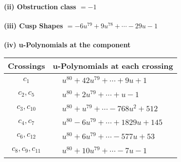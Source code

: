 \documentclass[1p]{elsarticle_modified}
\theoremstyle{definition}
\begin{document}
\flushleft \textbf{(ii) Obstruction class $= -1$}\\~\\
\flushleft \textbf{(iii) Cusp Shapes $= -6 u^{79}+9 u^{78}+\cdots-29 u-1$}\\~\\
\newpage\renewcommand{\arraystretch}{1}
\flushleft \textbf{(iv) u-Polynomials at the component}\newline \\
\begin{tabular}{m{50pt}|m{274pt}}
Crossings & \hspace{64pt}u-Polynomials at each crossing \\
\hline $$\begin{aligned}c_{1}\end{aligned}$$&$\begin{aligned}
&u^{80}+42 u^{79}+\cdots+9 u+1
\end{aligned}$\\
\hline $$\begin{aligned}c_{2},c_{5}\end{aligned}$$&$\begin{aligned}
&u^{80}+2 u^{79}+\cdots+u-1
\end{aligned}$\\
\hline $$\begin{aligned}c_{3},c_{10}\end{aligned}$$&$\begin{aligned}
&u^{80}+u^{79}+\cdots-768 u^2+512
\end{aligned}$\\
\hline $$\begin{aligned}c_{4},c_{7}\end{aligned}$$&$\begin{aligned}
&u^{80}-6 u^{79}+\cdots+1829 u+145
\end{aligned}$\\
\hline $$\begin{aligned}c_{6},c_{12}\end{aligned}$$&$\begin{aligned}
&u^{80}+6 u^{79}+\cdots-577 u+53
\end{aligned}$\\
\hline $$\begin{aligned}c_{8},c_{9},c_{11}\end{aligned}$$&$\begin{aligned}
&u^{80}+10 u^{79}+\cdots-7 u-1
\end{aligned}$\\
\hline
\end{tabular}\\~\\
\end{document}
